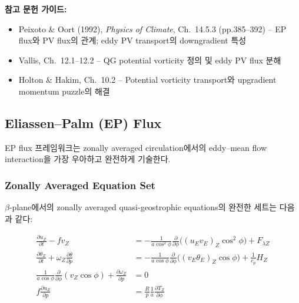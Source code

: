 \begin{hisublock}
\textbf{참고 문헌 가이드:}
\begin{itemize}
  \item Peixoto \& Oort (1992), \textit{Physics of Climate}, Ch.~14.5.3 (pp.385--392) -- EP flux와 PV flux의 관계; eddy PV transport의 downgradient 특성 
  \item Vallis, Ch.~12.1--12.2 -- QG potential vorticity 정의 및 eddy PV flux 분해
  \item Holton \& Hakim, Ch.~10.2 -- Potential vorticity transport와 upgradient momentum puzzle의 해결
\end{itemize}
\end{hisublock}


\subsection{Eliassen--Palm (EP) Flux}

EP flux 프레임워크는 zonally averaged circulation에서의
eddy--mean flow interaction을 가장 우아하고 완전하게 기술한다.

\subsubsection{Zonally Averaged Equation Set}

$\beta$-plane에서의 zonally averaged quasi-geostrophic equations의
완전한 세트는 다음과 같다:

\begin{align}
  \frac{\partial u_Z}{\partial t} - fv_Z
    &= -\frac{1}{a\cos^2\phi}\frac{\partial}{\partial\phi}
       \bigl((u_E v_E)_Z\cos^2\phi\bigr)
       + F_{\lambda Z}
  \label{eq:EP_umom}\\[4pt]
  \frac{\partial\theta_Z}{\partial t}
    + \omega_Z\frac{\partial\bar{\theta}}{\partial p}
    &= -\frac{1}{a\cos\phi}\frac{\partial}{\partial\phi}
       \bigl((v_E\theta_E)_Z\cos\phi\bigr)
       + \frac{1}{c_p}H_Z
  \label{eq:EP_thermo}\\[4pt]
  \frac{1}{a\cos\phi}\frac{\partial}{\partial\phi}(v_Z\cos\phi)
    + \frac{\partial\omega_Z}{\partial p} &= 0
  \label{eq:EP_cont}\\[4pt]
  f\frac{\partial u_Z}{\partial p}
    &= \frac{R}{p}\frac{1}{a}\frac{\partial T_Z}{\partial\phi}
  \label{eq:EP_twind}
\end{align}

